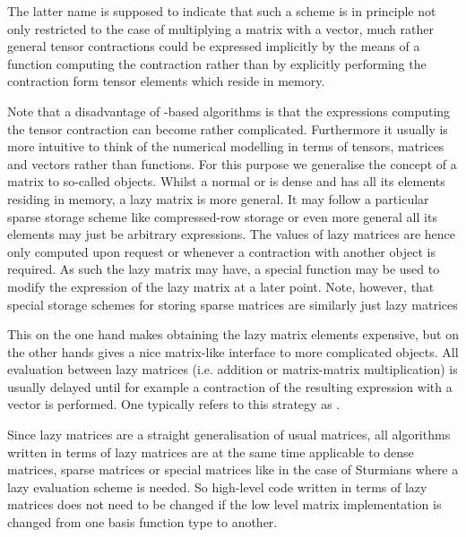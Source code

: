The latter name is supposed to indicate that such a scheme is in principle
not only restricted to the case of multiplying a matrix with a vector,
much rather general tensor contractions could be expressed implicitly
by the means of a function computing the contraction rather than
by explicitly performing the contraction form tensor elements
which reside in memory.

Note that a disadvantage of \contraction-based algorithms is that the expressions
computing the tensor contraction can become rather complicated.
Furthermore it usually is more intuitive to think of the
numerical modelling in terms of tensors, matrices and vectors
rather than \contraction functions.
For this purpose we generalise the concept of a matrix
to so-called  objects.
Whilst a normal or  is dense and has all its elements
residing in memory,
a lazy matrix is more general.
It may follow a particular sparse storage scheme
like compressed-row storage
or even more general all its elements may just be arbitrary expressions.
The values of lazy matrices are hence only computed upon request
or whenever a contraction with another object is required.
As such the lazy matrix may have, \ie a special \update function
may be used to modify the expression of the lazy matrix
at a later point.
Note, however, that special storage schemes for storing
sparse matrices are similarly just lazy matrices 

This on the one hand makes obtaining the lazy matrix elements
expensive, but on the other hands gives a nice matrix-like
interface to more complicated objects.
All evaluation between lazy matrices
(i.e. addition or matrix-matrix multiplication)
is usually delayed until for example a contraction of the resulting
expression with a vector is performed.
One typically refers to this strategy as .

Since lazy matrices are a straight generalisation
of usual matrices,
all algorithms written in terms of lazy matrices
are at the same time applicable to dense matrices,
sparse matrices or special matrices like in the case of Sturmians
where a lazy evaluation scheme is needed.
So high-level code written in terms of lazy matrices
does not need to be changed if the low level matrix implementation
is changed from one basis function type to another.

